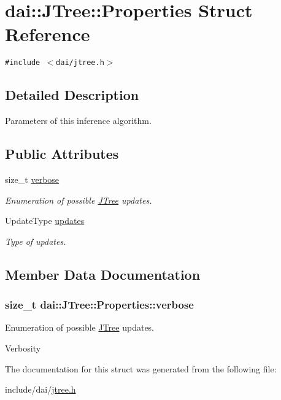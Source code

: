 \hypertarget{structdai_1_1JTree_1_1Properties}{
\section{dai::JTree::Properties Struct Reference}
\label{structdai_1_1JTree_1_1Properties}
}
{\tt \#include $<$dai/jtree.h$>$}



\subsection{Detailed Description}
Parameters of this inference algorithm. \subsection*{Public Attributes}
\begin{CompactItemize}
\item 
size\_\-t \hyperlink{structdai_1_1JTree_1_1Properties_f1115a3a2efbb2047f4305f3e88e364d}{verbose}
\begin{CompactList}\small\item\em Enumeration of possible \hyperlink{classdai_1_1JTree}{JTree} updates. \item\end{CompactList}\item 
\hypertarget{structdai_1_1JTree_1_1Properties_9120abdd0ab3d1456cc25526013df494}{
UpdateType \hyperlink{structdai_1_1JTree_1_1Properties_9120abdd0ab3d1456cc25526013df494}{updates}}
\label{structdai_1_1JTree_1_1Properties_9120abdd0ab3d1456cc25526013df494}

\begin{CompactList}\small\item\em Type of updates. \item\end{CompactList}\end{CompactItemize}


\subsection{Member Data Documentation}
\hypertarget{structdai_1_1JTree_1_1Properties_f1115a3a2efbb2047f4305f3e88e364d}{
\subsubsection[verbose]{\setlength{\rightskip}{0pt plus 5cm}size\_\-t {\bf dai::JTree::Properties::verbose}}}
\label{structdai_1_1JTree_1_1Properties_f1115a3a2efbb2047f4305f3e88e364d}


Enumeration of possible \hyperlink{classdai_1_1JTree}{JTree} updates. 

Verbosity 

The documentation for this struct was generated from the following file:\begin{CompactItemize}
\item 
include/dai/\hyperlink{jtree_8h}{jtree.h}\end{CompactItemize}
